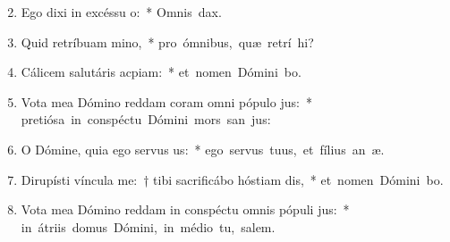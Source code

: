 \begin{flushleft}
\begin{enumerate}[leftmargin=*]
\setcounter{enumi}{1}


\item Ego dixi in excéssu o:~* \mbox{Omnis  dax.}
\item Quid retríbuam mino,~* \mbox{pro ómnibus, quæ retrí hi?}
\item Cálicem salutáris acpiam:~* \mbox{et nomen Dómini bo.}
\item Vota mea Dómino reddam coram omni pópulo jus:~* \mbox{pretiósa in conspéctu Dómini mors san jus:}
\item O Dómine, quia ego servus us:~* \mbox{ego servus tuus, et fílius an æ.}
\item Dirupísti víncula me:~† tibi sacrificábo hóstiam dis,~* \mbox{et nomen Dómini bo.}
\item Vota mea Dómino reddam in conspéctu omnis pópuli jus:~* \mbox{in átriis domus Dómini, in médio tu, salem.}

\end{enumerate}
\end{flushleft}

